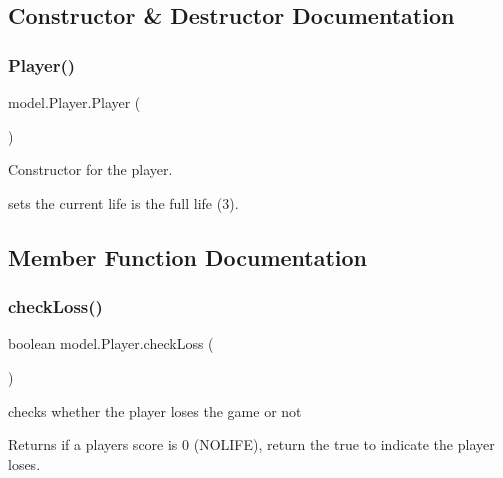 \subsection{Constructor \& Destructor Documentation}
\hypertarget{classmodel_1_1_player_a6922d8b0b084510c84540a3497504ed3}{}\label{classmodel_1_1_player_a6922d8b0b084510c84540a3497504ed3} 
\subsubsection{\texorpdfstring{Player()}{Player()}}
{\footnotesize\ttfamily model.\+Player.\+Player (\begin{DoxyParamCaption}{ }\end{DoxyParamCaption})}



Constructor for the player. 

sets the current life is the full life (3). 

\subsection{Member Function Documentation}
\hypertarget{classmodel_1_1_player_a1027595469ab5de940ba2f6cbb29e5ef}{}\label{classmodel_1_1_player_a1027595469ab5de940ba2f6cbb29e5ef} 
\subsubsection{\texorpdfstring{check\+Loss()}{checkLoss()}}
{\footnotesize\ttfamily boolean model.\+Player.\+check\+Loss (\begin{DoxyParamCaption}{ }\end{DoxyParamCaption})}



checks whether the player loses the game or not 

\begin{DoxyReturn}{Returns}
if a player\textquotesingle{}s score is 0 (N\+O\+L\+I\+FE), return the true to indicate the player loses. 
\end{DoxyReturn}
\hypertarget{classmodel_1_1_player_a5551dad23bcab60638b37c8f54dd6796}{}\label{classmodel_1_1_player_a5551dad23bcab60638b37c8f54dd6796} 
